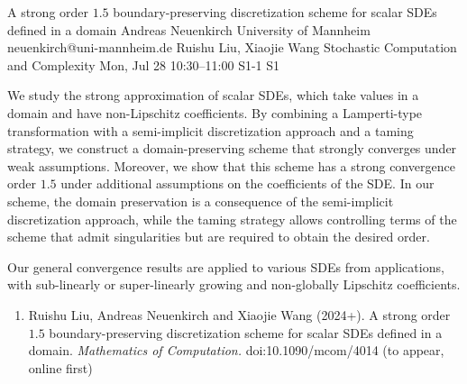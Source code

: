 \documentclass[12pt,lettersize,oneside]{book} %
\begin{document}
\begin{talk}
  {A strong order $1.5$ boundary-preserving discretization scheme for scalar SDEs defined in a domain}%
  {Andreas Neuenkirch}%
  {University of Mannheim}%
  {neuenkirch@uni-mannheim.de}%
  {Ruishu Liu, Xiaojie Wang}%
  {Stochastic Computation and Complexity}%
  {Mon, Jul 28 10:30--11:00}%
  {S1-1}%
  {S1}%
    
   
We study the strong approximation of scalar SDEs, which take values in a domain and have non-Lipschitz coefficients.
By combining a Lamperti-type transformation with a semi-implicit discretization approach and a taming 
strategy,  we construct a domain-preserving scheme that strongly converges under weak assumptions. 
Moreover,
we show that this scheme has a strong convergence order $1.5$ under additional assumptions on the coefficients of the SDE. In our scheme, the domain preservation is a consequence of the semi-implicit discretization approach, while the taming strategy allows controlling terms of the scheme that admit singularities but are required to obtain the desired order.

Our general convergence results  are  applied to various SDEs from applications, with sub-linearly or super-linearly growing and non-globally Lipschitz coefficients.


\medskip

\begin{enumerate}
 \item[{[1]}]  Ruishu Liu, Andreas Neuenkirch and Xiaojie Wang (2024+). A strong order $1.5$
 boundary-preserving discretization scheme for scalar SDEs defined in a domain. {\it Mathematics of Computation.} doi:10.1090/mcom/4014 (to appear, online first)
\end{enumerate}

\end{talk}
\end{document}
